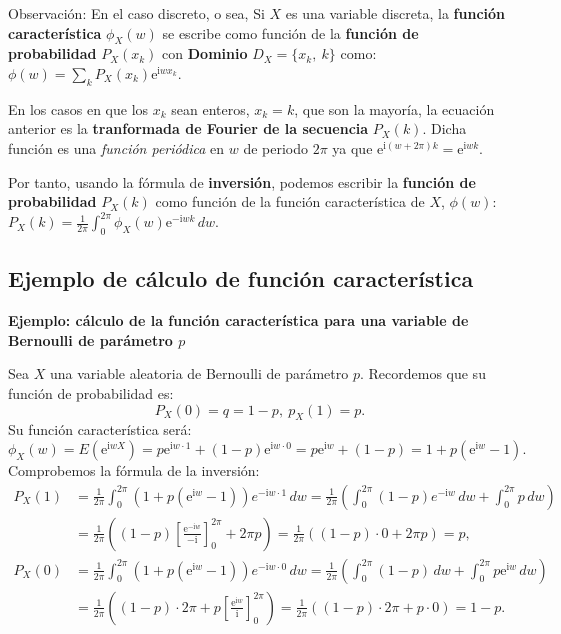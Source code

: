\documentclass[]{book}
\begin{document}
Observación:
En el caso discreto, o sea, Si \(X\) es una variable discreta, la \textbf{función característica} \(\phi_X(w)\) se escribe como función de la \textbf{función de probabilidad} \(P_X(x_k)\) con \textbf{Dominio} \(D_X=\{x_k,\ k\}\) como:
\(\phi(w)=\sum_{k} P_X(x_k)\mathrm{e}^{\mathrm{i}w x_k}.\)

En los casos en que los \(x_k\) sean enteros, \(x_k=k\), que son la mayoría, la ecuación anterior es la \textbf{tranformada de Fourier de la secuencia} \(P_X(k)\). Dicha función es una \emph{función periódica} en \(w\) de periodo \(2\pi\) ya que \(\mathrm{e}^{\mathrm{i}(w+2\pi)k}=\mathrm{e}^{\mathrm{i}wk}.\)

Por tanto, usando la fórmula de \textbf{inversión}, podemos escribir la \textbf{función de probabilidad} \(P_X(k)\) como función de la función característica de \(X\), \(\phi(w)\):
\(P_X(k)=\frac{1}{2\pi}\int_{0}^{2\pi} \phi_X(w)\mathrm{e}^{-\mathrm{i}w k}\, dw.\)

\hypertarget{ejemplo-de-cuxe1lculo-de-funciuxf3n-caracteruxedstica}{%
\subsection{Ejemplo de cálculo de función característica}\label{ejemplo-de-cuxe1lculo-de-funciuxf3n-caracteruxedstica}}

\textbf{Ejemplo: cálculo de la función característica para una variable de Bernoulli de parámetro \(p\)}

Sea \(X\) una variable aleatoria de Bernoulli de parámetro \(p\). Recordemos que su función de probabilidad es:
\[
P_X(0)=q=1-p,\ p_X(1)=p.
\]
Su función característica será:
\[
\phi_X (w)=E\left(\mathrm{e}^{\mathrm{i}wX}\right) =p\mathrm{e}^{\mathrm{i}w\cdot 1}+(1-p)\mathrm{e}^{\mathrm{i}w\cdot 0}=p\mathrm{e}^{\mathrm{i}w}+(1-p)=1+p\left(\mathrm{e}^{\mathrm{i}w} -1 \right).
\]
Comprobemos la fórmula de la inversión:
\[
\begin{array}{rl}
P_X(1) & = \frac{1}{2\pi}\int_0^{2\pi} \left(1+p\left(\mathrm{e}^{\mathrm{i}w} -1 \right)\right) e^{-\mathrm{i}w\cdot 1}\, dw =\frac{1}{2\pi}\left(\int_0^{2\pi} (1-p)e^{-\mathrm{i}w}\, dw + \int_0^{2\pi} p\, dw\right) \\ & = \frac{1}{2\pi}\left( (1-p) \left[\frac{\mathrm{e}^{-\mathrm{i}w}}{-\mathrm{i}}\right]_0^{2\pi} +2\pi p\right)=\frac{1}{2\pi}\left((1-p)\cdot 0 +2\pi p\right)=p, \\
P_X(0) & = \frac{1}{2\pi}\int_0^{2\pi} \left(1+p\left(\mathrm{e}^{\mathrm{i}w} -1 \right)\right) e^{-\mathrm{i}w\cdot 0}\, dw =\frac{1}{2\pi}\left(\int_0^{2\pi} (1-p) \, dw + \int_0^{2\pi} p \mathrm{e}^{\mathrm{i}w}\, dw\right) \\ & = \frac{1}{2\pi}\left( (1-p) \cdot 2\pi  +p \left[\frac{\mathrm{e}^{\mathrm{i}w}}{\mathrm{i}}\right]_0^{2\pi}\right)=\frac{1}{2\pi}\left((1-p)\cdot 2\pi + p\cdot 0\right)=1-p.
\end{array}
\]
\end{document}
